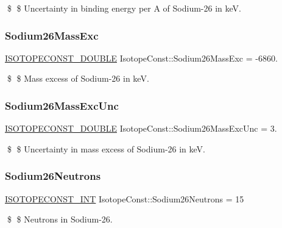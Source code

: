 \$ \$ Uncertainty in binding energy per A of Sodium-\/26 in keV. \mbox{\label{group___isotope_const-_sodium-_na26_gaf85d6768f452d42bbacd8b37a4f53db5}} 
\subsubsection{\texorpdfstring{Sodium26\+Mass\+Exc}{Sodium26MassExc}}
{\footnotesize\ttfamily \mbox{\hyperlink{group___isotope_const-_macros_ga8f45a7272ce02c0b4c65c44636ed719a}{I\+S\+O\+T\+O\+P\+E\+C\+O\+N\+S\+T\+\_\+\+D\+O\+U\+B\+LE}} Isotope\+Const\+::\+Sodium26\+Mass\+Exc = -\/6860.}

\$ \$ Mass excess of Sodium-\/26 in keV. \mbox{\label{group___isotope_const-_sodium-_na26_gaa71b84fa271039414a0a5f41931ee577}} 
\subsubsection{\texorpdfstring{Sodium26\+Mass\+Exc\+Unc}{Sodium26MassExcUnc}}
{\footnotesize\ttfamily \mbox{\hyperlink{group___isotope_const-_macros_ga8f45a7272ce02c0b4c65c44636ed719a}{I\+S\+O\+T\+O\+P\+E\+C\+O\+N\+S\+T\+\_\+\+D\+O\+U\+B\+LE}} Isotope\+Const\+::\+Sodium26\+Mass\+Exc\+Unc = 3.}

\$ \$ Uncertainty in mass excess of Sodium-\/26 in keV. \mbox{\label{group___isotope_const-_sodium-_na26_gafe40abe9f2f93d9d341ab4f7935b75ca}} 
\subsubsection{\texorpdfstring{Sodium26\+Neutrons}{Sodium26Neutrons}}
{\footnotesize\ttfamily \mbox{\hyperlink{group___isotope_const-_macros_ga5f18360b3e99483a35c32d789e62621c}{I\+S\+O\+T\+O\+P\+E\+C\+O\+N\+S\+T\+\_\+\+I\+NT}} Isotope\+Const\+::\+Sodium26\+Neutrons = 15}

\$ \$ Neutrons in Sodium-\/26. \mbox{\label{group___isotope_const-_sodium-_na26_ga5964faceed2deaa00df4cdd2563b96b7}} 
